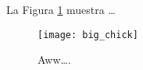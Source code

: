 \documentclass{article}
\begin{document}
La Figura \ref{fig:chick} 
muestra \ldots

\begin{figure}
\centering
\texttt{[image: big\_chick]}
\caption{\label{fig:chick}Aww\ldots.}
\end{figure}
\end{document}
